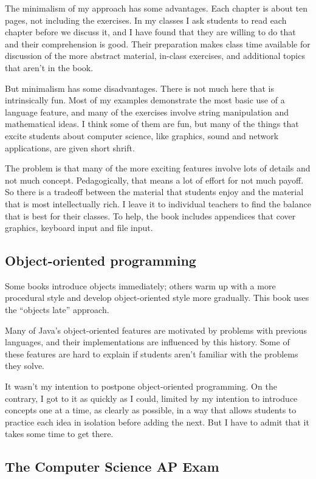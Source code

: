 \documentclass[12pt]{book}
\theoremstyle{exercise}
\begin{document}
The minimalism of my approach has some advantages.
Each chapter is about ten pages, not including the exercises.
In my classes I ask students to read each chapter before we
discuss it, and I have found that they are willing to do that
and their comprehension is good.  Their preparation makes
class time available for discussion of the more abstract material,
in-class exercises, and additional topics that aren't in the
book.

But minimalism has some disadvantages.  There is not much here
that is intrinsically fun.  Most of my examples demonstrate the
most basic use of a language feature, and many of the exercises
involve string manipulation and mathematical ideas.  I think some
of them are fun, but many of the things that excite students
about computer science, like graphics, sound and network applications,
are given short shrift.

The problem is that many of the more exciting features involve
lots of details and not much concept.  Pedagogically, that means
a lot of effort for not much payoff.  So there is a tradeoff between
the material that students enjoy and the material that is most
intellectually rich.  I leave it to individual teachers to find
the balance that is best for their classes.  To help, the book
includes appendices that cover graphics, keyboard input and
file input.

\subsection*{Object-oriented programming}

Some books introduce objects immediately; others warm up with a more
procedural style and develop object-oriented style more gradually.
This book uses the ``objects late'' approach.

Many of Java's object-oriented features are motivated
by problems with previous languages, and their implementations
are influenced by this history.  Some of these features are
hard to explain if students aren't familiar with the problems
they solve.

It wasn't my intention to postpone object-oriented programming.
On the contrary, I got to it as quickly as I could, limited by
my intention to introduce concepts one at a time, as clearly
as possible, in a way that allows students to practice each
idea in isolation before adding the next.  But I have to admit
that it takes some time to get there.

\subsection*{The Computer Science AP Exam}
\end{document}
